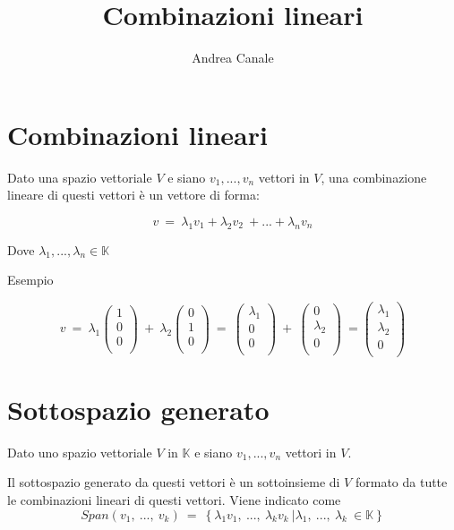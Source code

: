\documentclass[a4paper, 10pt]{article}
\title{Combinazioni lineari}
\author{Andrea Canale}
\begin{document}
	
\maketitle
\tableofcontents
\section{Combinazioni lineari}

Dato una spazio vettoriale $V$ e siano $v_1, ..., v_n$ vettori in $V$, una combinazione lineare di questi vettori è un vettore di forma:

$$v\ =\ \lambda_1v_1+\lambda_2v_2\ +...+\lambda_nv_n$$

Dove $\lambda_1, ..., \lambda_n \in \mathbb{K}$

Esempio

$$v\ =\ \lambda_1\left(\begin{matrix}1\\0\\0\\\end{matrix}\right)\ +\ \lambda_2\left(\begin{matrix}0\\1\\0\\\end{matrix}\right)\ =\ \left(\begin{matrix}\lambda_1\\0\\0\\\end{matrix}\right)\ +\ \left(\begin{matrix}0\\\lambda_2\\0\\\end{matrix}\right)\ =\left(\begin{matrix}\lambda_1\\\lambda_2\\0\\\end{matrix}\right)$$

\section{Sottospazio generato}

Dato uno spazio vettoriale $V$ in $\mathbb{K}$ e siano $v_1, ..., v_n$ vettori in $V$.

Il sottospazio generato da questi vettori è un sottoinsieme di $V$ formato da tutte le combinazioni lineari di questi vettori. Viene indicato come $$Span\left(v_1,\ ...,\ v_k\right)\ =\ \left\{\lambda_1v_1,\ ...,\ \lambda_kv_k\ |\lambda_1,\ ...,\ \lambda_k\ \in\mathbb{K}\right\}$$
\end{document}
